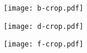 

\pagestyle{plain}



\texttt{[image: b-crop.pdf]}

\texttt{[image: d-crop.pdf]}

\texttt{[image: f-crop.pdf]}



